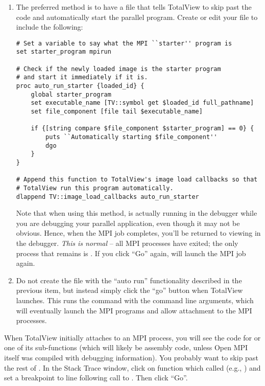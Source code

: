 \begin{enumerate}
\item The preferred method is to have a  file
  that tells TotalView to skip past the  code and
  automatically start the parallel program.  Create or edit your
   file to include the following:

\lstset{style=ompi-shell}
\begin{lstlisting}
# Set a variable to say what the MPI ``starter'' program is
set starter_program mpirun

# Check if the newly loaded image is the starter program
# and start it immediately if it is.
proc auto_run_starter {loaded_id} {
    global starter_program
    set executable_name [TV::symbol get $loaded_id full_pathname]
    set file_component [file tail $executable_name]
                               
    if {[string compare $file_component $starter_program] == 0} {
        puts ``Automatically starting $file_component''
        dgo
    }
}

# Append this function to TotalView's image load callbacks so that
# TotalView run this program automatically.
dlappend TV::image_load_callbacks auto_run_starter
\end{lstlisting}

Note that when using this method,  is actually running in
the debugger while you are debugging your parallel application, even
though it may not be obvious.  Hence, when the MPI job completes,
you'll be returned to viewing  in the debugger.  {\em This
  is normal} -- all MPI processes have exited; the only process that
remains is .  If you click ``Go'' again,  will
launch the MPI job again.

\item Do not create the  file with the ``auto
  run'' functionality described in the previous item, but instead
  simply click the ``go'' button when TotalView launches.  This runs
  the  command with the command line arguments, which will
  eventually launch the MPI programs and allow attachment to the MPI
  processes.
  
\end{enumerate}

When TotalView initially attaches to an MPI process, you will see the
code for  or one of its sub-functions (which will
likely be assembly code, unless Open MPI itself was compiled with debugging
information).
%
You probably want to skip past the rest of .  In
the Stack Trace window, click on function which called
 (e.g., ) and set a breakpoint to line
following call to .  Then click ``Go''.

